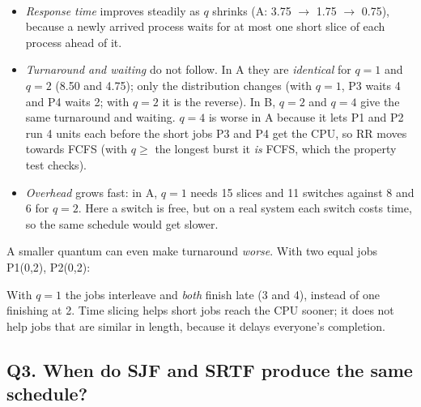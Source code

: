 \documentclass[11pt,a4paper]{article}
\begin{document}
\begin{center}\\[4pt]\end{center}

\begin{itemize}
  \item \emph{Response time} improves steadily as $q$ shrinks (A: 3.75 $\to$ 1.75 $\to$ 0.75), because a newly arrived
    process waits for at most one short slice of each process ahead of it.
  \item \emph{Turnaround and waiting} do not follow. In A they are \emph{identical} for $q=1$ and $q=2$ (8.50 and
    4.75); only the distribution changes (with $q=1$, P3 waits 4 and P4 waits 2; with $q=2$ it is the reverse). In B,
    $q=2$ and $q=4$ give the same turnaround and waiting. $q=4$ is worse in A because it lets P1 and P2 run 4 units each
    before the short jobs P3 and P4 get the CPU, so RR moves towards FCFS (with $q \ge$ the longest burst it \emph{is}
    FCFS, which the property test checks).
  \item \emph{Overhead} grows fast: in A, $q=1$ needs 15 slices and 11 switches against 8 and 6 for $q=2$. Here a switch
    is free, but on a real system each switch costs time, so the same schedule would get slower.
\end{itemize}
A smaller quantum can even make turnaround \emph{worse}. With two equal jobs P1(0,2), P2(0,2):
\begin{itemize}\end{itemize}
With $q=1$ the jobs interleave and \emph{both} finish late (3 and 4), instead of one finishing at 2. Time slicing helps
short jobs reach the CPU sooner; it does not help jobs that are similar in length, because it delays everyone's completion.

\subsection*{Q3. When do SJF and SRTF produce the same schedule?}
\end{document}
